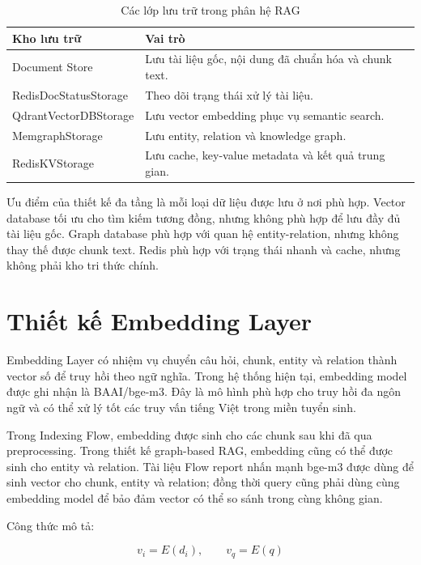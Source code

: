\begin{table}[H]
\centering
\begin{tabular}{|p{4.3cm}|p{8.7cm}|}
\hline
\textbf{Kho lưu trữ} & \textbf{Vai trò} \\
\hline
Document Store & Lưu tài liệu gốc, nội dung đã chuẩn hóa và chunk text. \\
\hline
RedisDocStatusStorage & Theo dõi trạng thái xử lý tài liệu. \\
\hline
QdrantVectorDBStorage & Lưu vector embedding phục vụ semantic search. \\
\hline
MemgraphStorage & Lưu entity, relation và knowledge graph. \\
\hline
RedisKVStorage & Lưu cache, key-value metadata và kết quả trung gian. \\
\hline
\end{tabular}
\caption{Các lớp lưu trữ trong phân hệ RAG}
\label{tab:rag-storage-layers}
\end{table}

Ưu điểm của thiết kế đa tầng là mỗi loại dữ liệu được lưu ở nơi phù hợp. Vector database tối ưu cho tìm kiếm tương đồng, nhưng không phù hợp để lưu đầy đủ tài liệu gốc. Graph database phù hợp với quan hệ entity-relation, nhưng không thay thế được chunk text. Redis phù hợp với trạng thái nhanh và cache, nhưng không phải kho tri thức chính.

\section{Thiết kế Embedding Layer}

Embedding Layer có nhiệm vụ chuyển câu hỏi, chunk, entity và relation thành vector số để truy hồi theo ngữ nghĩa. Trong hệ thống hiện tại, embedding model được ghi nhận là BAAI/bge-m3. Đây là mô hình phù hợp cho truy hồi đa ngôn ngữ và có thể xử lý tốt các truy vấn tiếng Việt trong miền tuyển sinh.

Trong Indexing Flow, embedding được sinh cho các chunk sau khi đã qua preprocessing. Trong thiết kế graph-based RAG, embedding cũng có thể được sinh cho entity và relation. Tài liệu Flow report nhấn mạnh bge-m3 được dùng để sinh vector cho chunk, entity và relation; đồng thời query cũng phải dùng cùng embedding model để bảo đảm vector có thể so sánh trong cùng không gian.

Công thức mô tả:

\begin{equation}
v_i = E(d_i), \qquad v_q = E(q)
\end{equation}

